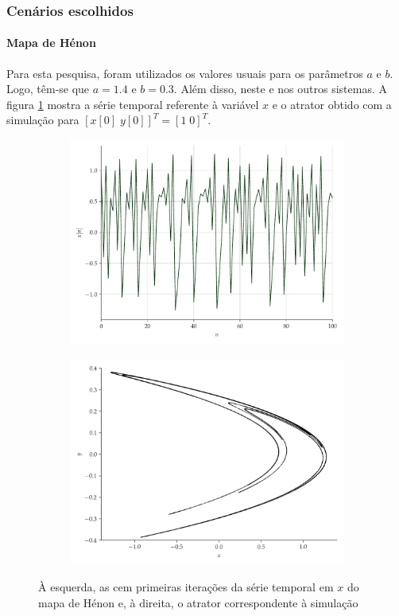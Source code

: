 \documentclass{beamer}
\begin{document}
\begin{frame}
	\frametitle{Cenários escolhidos}
	\framesubtitle{Mapa de Hénon}
\justifying Para esta pesquisa, foram utilizados os valores usuais para os parâmetros $a$ e $b$. Logo, têm-se que $a = 1.4$ e $b = 0.3$. Além disso, neste e nos outros sistemas. A figura \ref{fig:henon} mostra a série temporal referente à variável $x$ e o atrator obtido com a simulação para $[x[0]\; y[0]]^T = [1\; 0]^T$.
\begin{figure}[H]
     \begin{subfigure}[t]{0.3\textwidth}
         \includegraphics[scale=0.2]{serie-henon-x.pdf}
     \end{subfigure}
     \centering
     \begin{subfigure}[t]{0.3\textwidth}
         \includegraphics[scale=0.2]{mapa-de-henon.png}
     \end{subfigure}
     \caption{À esquerda, as cem primeiras iterações da série temporal em $x$ do mapa de Hénon e, à direita, o atrator correspondente à simulação}
     \label{fig:henon}
\end{figure}
\end{frame}
\end{document}
